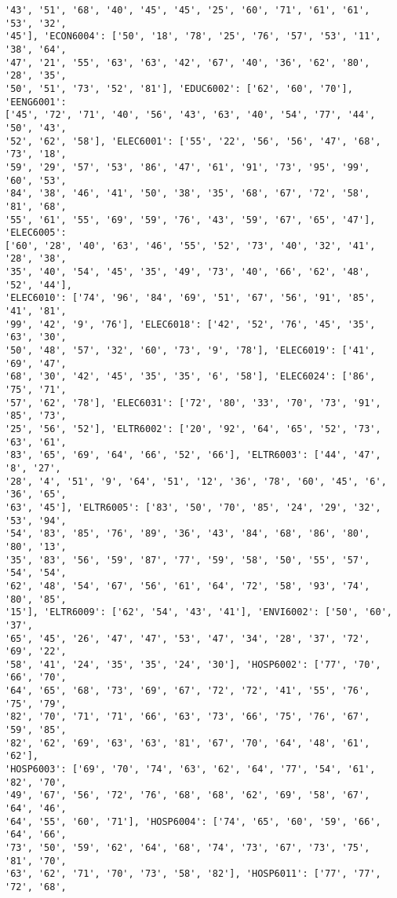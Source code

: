 \documentclass[11pt]{article}
\begin{document}
\begin{Verbatim}[commandchars=\\\{\}]
'43', '51', '68', '40', '45', '45', '25', '60', '71', '61', '61', '53', '32',
'45'], 'ECON6004': ['50', '18', '78', '25', '76', '57', '53', '11', '38', '64',
'47', '21', '55', '63', '63', '42', '67', '40', '36', '62', '80', '28', '35',
'50', '51', '73', '52', '81'], 'EDUC6002': ['62', '60', '70'], 'EENG6001':
['45', '72', '71', '40', '56', '43', '63', '40', '54', '77', '44', '50', '43',
'52', '62', '58'], 'ELEC6001': ['55', '22', '56', '56', '47', '68', '73', '18',
'59', '29', '57', '53', '86', '47', '61', '91', '73', '95', '99', '60', '53',
'84', '38', '46', '41', '50', '38', '35', '68', '67', '72', '58', '81', '68',
'55', '61', '55', '69', '59', '76', '43', '59', '67', '65', '47'], 'ELEC6005':
['60', '28', '40', '63', '46', '55', '52', '73', '40', '32', '41', '28', '38',
'35', '40', '54', '45', '35', '49', '73', '40', '66', '62', '48', '52', '44'],
'ELEC6010': ['74', '96', '84', '69', '51', '67', '56', '91', '85', '41', '81',
'99', '42', '9', '76'], 'ELEC6018': ['42', '52', '76', '45', '35', '63', '30',
'50', '48', '57', '32', '60', '73', '9', '78'], 'ELEC6019': ['41', '69', '47',
'68', '30', '42', '45', '35', '35', '6', '58'], 'ELEC6024': ['86', '75', '71',
'57', '62', '78'], 'ELEC6031': ['72', '80', '33', '70', '73', '91', '85', '73',
'25', '56', '52'], 'ELTR6002': ['20', '92', '64', '65', '52', '73', '63', '61',
'83', '65', '69', '64', '66', '52', '66'], 'ELTR6003': ['44', '47', '8', '27',
'28', '4', '51', '9', '64', '51', '12', '36', '78', '60', '45', '6', '36', '65',
'63', '45'], 'ELTR6005': ['83', '50', '70', '85', '24', '29', '32', '53', '94',
'54', '83', '85', '76', '89', '36', '43', '84', '68', '86', '80', '80', '13',
'35', '83', '56', '59', '87', '77', '59', '58', '50', '55', '57', '54', '54',
'62', '48', '54', '67', '56', '61', '64', '72', '58', '93', '74', '80', '85',
'15'], 'ELTR6009': ['62', '54', '43', '41'], 'ENVI6002': ['50', '60', '37',
'65', '45', '26', '47', '47', '53', '47', '34', '28', '37', '72', '69', '22',
'58', '41', '24', '35', '35', '24', '30'], 'HOSP6002': ['77', '70', '66', '70',
'64', '65', '68', '73', '69', '67', '72', '72', '41', '55', '76', '75', '79',
'82', '70', '71', '71', '66', '63', '73', '66', '75', '76', '67', '59', '85',
'82', '62', '69', '63', '63', '81', '67', '70', '64', '48', '61', '62'],
'HOSP6003': ['69', '70', '74', '63', '62', '64', '77', '54', '61', '82', '70',
'49', '67', '56', '72', '76', '68', '68', '62', '69', '58', '67', '64', '46',
'64', '55', '60', '71'], 'HOSP6004': ['74', '65', '60', '59', '66', '64', '66',
'73', '50', '59', '62', '64', '68', '74', '73', '67', '73', '75', '81', '70',
'63', '62', '71', '70', '73', '58', '82'], 'HOSP6011': ['77', '77', '72', '68',

\end{Verbatim}
\end{document}
